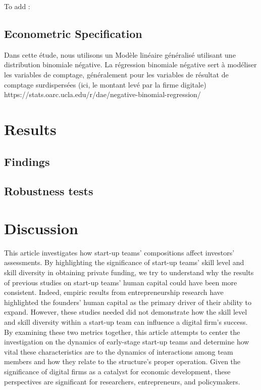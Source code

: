 \documentclass[12pt]{article}
\begin{document}
To add : \citet{ratzinger2018impact}

\subsection{Econometric Specification}

Dans cette étude, nous utilisons un Modèle linéaire généralisé utilisant une distribution binomiale négative. La régression binomiale négative sert à modéliser les variables de comptage, généralement pour les variables de résultat de comptage surdispersées (ici, le montant levé par la firme digitale) https://stats.oarc.ucla.edu/r/dae/negative-binomial-regression/

\section{Results}

\subsection{Findings}


\subsection{Robustness tests}


\section{Discussion}

This article investigates how start-up teams' compositions affect investors' assessments. By highlighting the significance of start-up teams' skill level and skill diversity in obtaining private funding, we try to understand why the results of previous studies on start-up teams' human capital could have been more consistent. Indeed, empiric results from entrepreneurship research have highlighted the founders' human capital as the primary driver of their ability to expand. However, these studies needed did not demonstrate how the skill level and skill diversity within a start-up team can influence a digital firm's success. By examining these two metrics together, this article attempts to center the investigation on the dynamics of early-stage start-up teams and determine how vital these characteristics are to the dynamics of interactions among team members and how they relate to the structure's proper operation. Given the significance of digital firms as a catalyst for economic development, these perspectives are significant for researchers, entrepreneurs, and policymakers.
\end{document}
